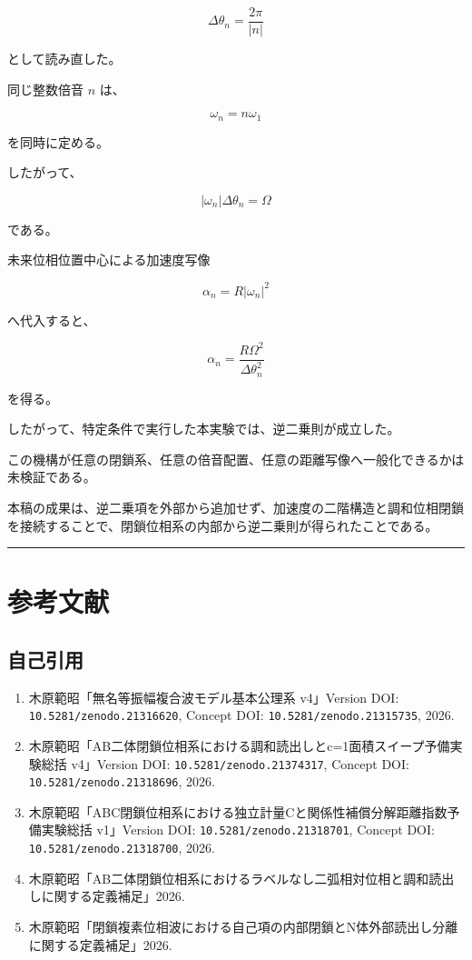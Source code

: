\documentclass[
  10pt,
  a4paper,
]{ltjsarticle}
\providecommand{\tightlist}{%
  \setlength{\itemsep}{0pt}\setlength{\parskip}{0pt}}
\begin{document}
\[
\Delta\theta_n=\frac{2\pi}{|n|}
\]

として読み直した。

同じ整数倍音 \(n\) は、

\[
\omega_n=n\omega_1
\]

を同時に定める。

したがって、

\[
|\omega_n|\Delta\theta_n=\Omega
\]

である。

未来位相位置中心による加速度写像

\[
\alpha_n=R|\omega_n|^2
\]

へ代入すると、

\[
\boxed{
\alpha_n
=\frac{R\Omega^2}{\Delta\theta_n^2}
}
\]

を得る。

したがって、特定条件で実行した本実験では、逆二乗則が成立した。

この機構が任意の閉鎖系、任意の倍音配置、任意の距離写像へ一般化できるかは未検証である。

本稿の成果は、逆二乗項を外部から追加せず、加速度の二階構造と調和位相閉鎖を接続することで、閉鎖位相系の内部から逆二乗則が得られたことである。

\begin{center}\rule{0.5\linewidth}{0.5pt}\end{center}

\section{参考文献}\label{ux53c2ux8003ux6587ux732e}

\subsection{自己引用}\label{ux81eaux5df1ux5f15ux7528}

\begin{enumerate}
\def\labelenumi{\arabic{enumi}.}
\tightlist
\item
  木原範昭「無名等振幅複合波モデル基本公理系 v4」Version DOI:
  \texttt{10.5281/zenodo.21316620}, Concept DOI:
  \texttt{10.5281/zenodo.21315735}, 2026.
\item
  木原範昭「AB二体閉鎖位相系における調和読出しとc=1面積スイープ予備実験総括
  v4」Version DOI: \texttt{10.5281/zenodo.21374317}, Concept DOI:
  \texttt{10.5281/zenodo.21318696}, 2026.
\item
  木原範昭「ABC閉鎖位相系における独立計量Cと関係性補償分解距離指数予備実験総括
  v1」Version DOI: \texttt{10.5281/zenodo.21318701}, Concept DOI:
  \texttt{10.5281/zenodo.21318700}, 2026.
\item
  木原範昭「AB二体閉鎖位相系におけるラベルなし二弧相対位相と調和読出しに関する定義補足」2026.
\item
  木原範昭「閉鎖複素位相波における自己項の内部閉鎖とN体外部読出し分離に関する定義補足」2026.
\end{enumerate}
\end{document}
